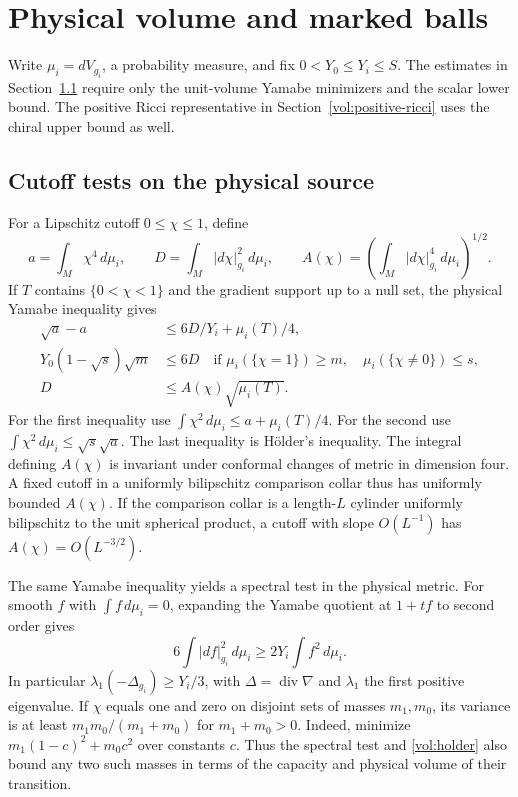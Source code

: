 \section{Physical volume and marked balls}
\label{sec:volume-witnesses}

Write \(\mu_i=dV_{g_i}\), a probability measure, and fix
\(0<Y_0\leq Y_i\leq S\). The estimates in
Section~\ref{vol:physical-tests} require only the unit-volume Yamabe
minimizers and the scalar lower bound. The positive Ricci representative
in Section~\ref{vol:positive-ricci} uses the chiral upper bound as well.

\subsection{Cutoff tests on the physical source}
\label{vol:physical-tests}

For a Lipschitz cutoff \(0\leq\chi\leq1\), define
\[
 a=\int_M\chi^4\,d\mu_i,\qquad
 D=\int_M|d\chi|_{g_i}^2\,d\mu_i,\qquad
 A(\chi)=\left(\int_M|d\chi|_{g_i}^4\,d\mu_i\right)^{1/2}.
\]
If \(T\) contains \(\{0<\chi<1\}\) and the gradient support up to a
null set, the physical Yamabe inequality gives
\begin{align}
 \sqrt a-a&\leq 6D/Y_i+\mu_i(T)/4,\label{vol:yamabe-partition}\\
 Y_0(1-\sqrt{s})\sqrt m&\leq 6D
 \quad\text{if }\mu_i(\{\chi=1\})\geq m,\quad
                   \mu_i(\{\chi\ne0\})\leq s,\label{vol:small-support}\\
 D&\leq A(\chi)\sqrt{\mu_i(T)}.\label{vol:holder}
\end{align}
For the first inequality use
\(\int\chi^2\,d\mu_i\leq a+\mu_i(T)/4\).
For the second use \(\int\chi^2\,d\mu_i\leq\sqrt{s}\sqrt a\).
The last inequality is H\"older's inequality. The integral defining
\(A(\chi)\) is invariant under conformal changes of metric in dimension
four. A fixed cutoff in a uniformly bilipschitz comparison collar thus
has uniformly bounded \(A(\chi)\). If the comparison collar is a
length-\(L\) cylinder uniformly bilipschitz to the unit spherical product, a
cutoff with slope \(O(L^{-1})\) has \(A(\chi)=O(L^{-3/2})\).

The same Yamabe inequality yields a spectral test in the physical
metric. For smooth \(f\) with \(\int f\,d\mu_i=0\), expanding the
Yamabe quotient at \(1+t f\) to second order gives
\[
 6\int|df|_{g_i}^2\,d\mu_i\geq 2Y_i\int f^2\,d\mu_i .
\]
In particular \(\lambda_1(-\Delta_{g_i})\geq Y_i/3\), with
\(\Delta=\operatorname{div}\nabla\) and \(\lambda_1\) the first
positive eigenvalue. If \(\chi\) equals one and zero on disjoint sets
of masses \(m_1,m_0\), its variance is at least
\(m_1m_0/(m_1+m_0)\) for \(m_1+m_0>0\). Indeed, minimize
\(m_1(1-c)^2+m_0c^2\) over constants \(c\). Thus the spectral test and
\eqref{vol:holder} also bound any two such masses in terms of the
capacity and physical volume of their transition.

